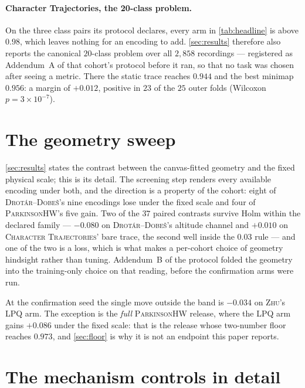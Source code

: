 \documentclass[10pt,a4paper]{article}
\begin{document}
\paragraph{Character Trajectories, the 20-class problem.} On the three class pairs its protocol
declares, every arm in \cref{tab:headline} is above $0.98$, which leaves nothing for an encoding to
add. \cref{sec:results} therefore also reports the canonical $20$-class problem over all $2{,}858$
recordings --- registered as Addendum~A of that cohort's protocol before it ran, so that no task was
chosen after seeing a metric. There the static trace reaches $0.944$ and the best minimap $0.956$: a
margin of $+0.012$, positive in $23$ of the $25$ outer folds (Wilcoxon $p = 3 \times 10^{-7}$).

\section{The geometry sweep}
\label{sec:geometry-appendix}

\cref{sec:results} states the contrast between the canvas-fitted geometry and the fixed physical
scale; this is its detail. The screening step renders every available encoding under both, and the
direction is a property of the cohort: eight of \textsc{Drot\'ar--Dobe\v{s}}'s nine encodings lose
under the fixed scale and four of \textsc{ParkinsonHW}'s five gain. Two of the $37$ paired
contrasts survive Holm within the declared family --- $-0.080$ on \textsc{Drot\'ar--Dobe\v{s}}'s
altitude channel and $+0.010$ on \textsc{Character Trajectories}' bare trace, the second well
inside the $0.03$ rule --- and one of the two is a loss, which is what makes a per-cohort choice of
geometry hindsight rather than tuning. Addendum~B of the protocol folded the geometry into the
training-only choice on that reading, before the confirmation arms were run.

At the confirmation seed the single move outside the band is $-0.034$ on \textsc{Zhu}'s LPQ arm.
The exception is the \emph{full} \textsc{ParkinsonHW} release, where the LPQ arm gains $+0.086$
under the fixed scale: that is the release whose two-number floor reaches $0.973$, and
\cref{sec:floor} is why it is not an endpoint this paper reports.

\section{The mechanism controls in detail}
\label{sec:controls-appendix}
\end{document}
